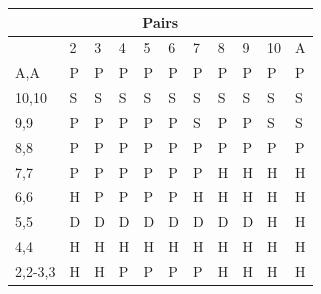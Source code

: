 \documentclass[conference]{IEEEtran}
\begin{document}
\begin{table}[ht]
\begin{tabular}{|l|l|l|l|l|l|l|l|l|l|l|}
\multicolumn{11}{|c|}{\textbf{Pairs}}                                 \\ \hline
                             & 2 & 3 & 4 & 5 & 6 & 7 & 8 & 9 & 10 & A \\ \hline
A,A                          & \cellcolor{yellow!75}P & \cellcolor{yellow!75}P & \cellcolor{yellow!75}P & \cellcolor{yellow!75}P & \cellcolor{yellow!75}P & \cellcolor{yellow!75}P & \cellcolor{yellow!75}P & \cellcolor{yellow!75}P & \cellcolor{yellow!75}P & \cellcolor{yellow!75}P  \\ \hline
10,10                        & \cellcolor{red!75}S & \cellcolor{red!75}S & \cellcolor{red!75}S & \cellcolor{red!75}S & \cellcolor{red!75}S & \cellcolor{red!75}S & \cellcolor{red!75}S & \cellcolor{red!75}S & \cellcolor{red!75}S & \cellcolor{red!75}S  \\ \hline
9,9                          & \cellcolor{yellow!75}P & \cellcolor{yellow!75}P & \cellcolor{yellow!75}P & \cellcolor{yellow!75}P & \cellcolor{yellow!75}P & \cellcolor{red!75}S & \cellcolor{yellow!75}\cellcolor{yellow!75}P & \cellcolor{yellow!75}P & \cellcolor{red!75}S & \cellcolor{red!75}S  \\ \hline
8,8                          & \cellcolor{yellow!75}P & \cellcolor{yellow!75}P & \cellcolor{yellow!75}P & \cellcolor{yellow!75}P & \cellcolor{yellow!75}P & \cellcolor{yellow!75}P & \cellcolor{yellow!75}P & \cellcolor{yellow!75}P & \cellcolor{yellow!75}P & \cellcolor{yellow!75}P  \\ \hline
7,7                          & \cellcolor{yellow!75}P & \cellcolor{yellow!75}P & \cellcolor{yellow!75}P & \cellcolor{yellow!75}P & \cellcolor{yellow!75}P & \cellcolor{yellow!75}P & \cellcolor{green!50}H & \cellcolor{green!50}H & \cellcolor{green!50}H & \cellcolor{green!50}H  \\ \hline
6,6                          & \cellcolor{green!50}H & \cellcolor{yellow!75}P & \cellcolor{yellow!75}P & \cellcolor{yellow!75}P & \cellcolor{yellow!75}P & \cellcolor{green!50}H & \cellcolor{green!50}H & \cellcolor{green!50}H & \cellcolor{green!50}H & \cellcolor{green!50}H  \\ \hline
5,5                          & \cellcolor{blue!25}D & \cellcolor{blue!25}D & \cellcolor{blue!25}D & \cellcolor{blue!25}D & \cellcolor{blue!25}D & \cellcolor{blue!25}D & \cellcolor{blue!25}D & \cellcolor{blue!25}D & \cellcolor{green!50}H & \cellcolor{green!50}H  \\ \hline
4,4                          & \cellcolor{green!50}H & \cellcolor{green!50}H & \cellcolor{green!50}H & \cellcolor{green!50}H & \cellcolor{green!50}H & \cellcolor{green!50}H & \cellcolor{green!50}H & \cellcolor{green!50}H & \cellcolor{green!50}H & \cellcolor{green!50}H  \\ \hline
2,2-3,3                      & \cellcolor{green!50}H & \cellcolor{green!50}H & \cellcolor{yellow!75}P & \cellcolor{yellow!75}P & \cellcolor{yellow!75}P & \cellcolor{yellow!75}P & \cellcolor{green!50}H & \cellcolor{green!50}H & \cellcolor{green!50}H & \cellcolor{green!50}H  \\ \hline
\end{tabular}
\end{table}
\end{document}
